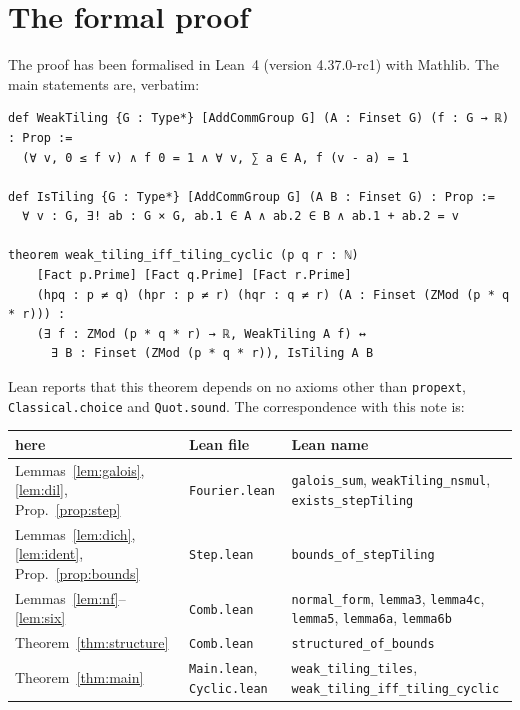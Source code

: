 \documentclass[11pt,a4paper]{amsart}
\theoremstyle{definition}
\theoremstyle{remark}
\newcommand{\lean}[1]{\texttt{#1}}
\begin{document}
\section{The formal proof}\label{sec:lean}

The proof has been formalised in Lean~4 (version 4.37.0-rc1) with Mathlib. The main statements are, verbatim:
{\small
\begin{verbatim}
def WeakTiling {G : Type*} [AddCommGroup G] (A : Finset G) (f : G → ℝ) : Prop :=
  (∀ v, 0 ≤ f v) ∧ f 0 = 1 ∧ ∀ v, ∑ a ∈ A, f (v - a) = 1

def IsTiling {G : Type*} [AddCommGroup G] (A B : Finset G) : Prop :=
  ∀ v : G, ∃! ab : G × G, ab.1 ∈ A ∧ ab.2 ∈ B ∧ ab.1 + ab.2 = v

theorem weak_tiling_iff_tiling_cyclic (p q r : ℕ)
    [Fact p.Prime] [Fact q.Prime] [Fact r.Prime]
    (hpq : p ≠ q) (hpr : p ≠ r) (hqr : q ≠ r) (A : Finset (ZMod (p * q * r))) :
    (∃ f : ZMod (p * q * r) → ℝ, WeakTiling A f) ↔
      ∃ B : Finset (ZMod (p * q * r)), IsTiling A B
\end{verbatim}}
\noindent Lean reports that this theorem depends on no axioms other than \texttt{propext},
\texttt{Classical.choice} and \texttt{Quot.sound}. The correspondence with this note is:

\medskip
\begin{center}\small
\begin{tabular}{p{}p{}p{}}
\hline
here & Lean file & Lean name\\
\hline
Lemmas~\ref{lem:galois}, \ref{lem:dil}, Prop.~\ref{prop:step} & \lean{Fourier.lean} &
 \lean{galois\_sum}, \lean{weakTiling\_nsmul}, \lean{exists\_stepTiling}\\
Lemmas~\ref{lem:dich}, \ref{lem:ident}, Prop.~\ref{prop:bounds} & \lean{Step.lean} & \lean{bounds\_of\_stepTiling}\\
Lemmas~\ref{lem:nf}--\ref{lem:six} & \lean{Comb.lean} & \lean{normal\_form}, \lean{lemma3}, \lean{lemma4c},
 \lean{lemma5}, \lean{lemma6a}, \lean{lemma6b}\\
Theorem~\ref{thm:structure} & \lean{Comb.lean} & \lean{structured\_of\_bounds}\\
Theorem~\ref{thm:main} & \lean{Main.lean}, \lean{Cyclic.lean} & \lean{weak\_tiling\_tiles},
 \lean{weak\_tiling\_iff\_tiling\_cyclic}\\
\hline
\end{tabular}
\end{center}
\medskip
\end{document}
